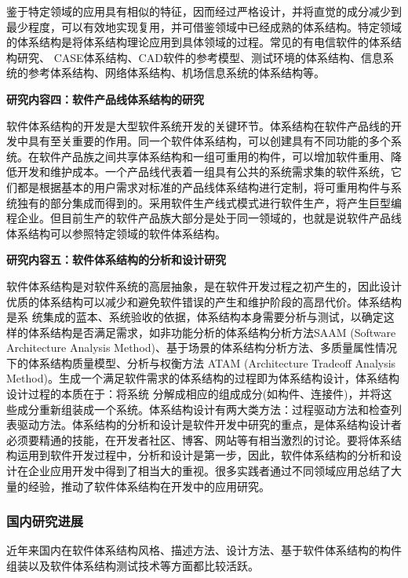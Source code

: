\documentclass[article]{BJTU-thesis}
\begin{document}
	鉴于特定领域的应用具有相似的特征，因而经过严格设计，并将直觉的成分减少到最少程度，可以有效地实现复用，并可借鉴领域中已经成熟的体系结构。特定领域的体系结构是将体系结构理论应用到具体领域的过程。常见的有电信软件的体系结构研究、 CASE体系结构、CAD软件的参考模型、测试环境的体系结构、信息系统的参考体系结构、网络体系结构、机场信息系统的体系结构等。
	\newline
	
	\noindent\textbf{研究内容四：软件产品线体系结构的研究}
	
	 软件体系结构的开发是大型软件系统开发的关键环节。体系结构在软件产品线的开发中具有至关重要的作用。同一个软件体系结构，可以创建具有不同功能的多个系统。在软件产品族之间共享体系结构和一组可重用的构件，可以增加软件重用、降低开发和维护成本。一个产品线代表着一组具有公共的系统需求集的软件系统，它们都是根据基本的用户需求对标准的产品线体系结构进行定制，将可重用构件与系统独有的部分集成而得到的。采用软件生产线式模式进行软件生产，将产生巨型编程企业。但目前生产的软件产品族大部分是处于同一领域的，也就是说软件产品线体系结构可以参照特定领域的软件体系结构。
	\newline
	
	\noindent\textbf{研究内容五：软件体系结构的分析和设计研究}
	
	软件体系结构是对软件系统的高层抽象，是在软件开发过程之初产生的，因此设计优质的体系结构可以减少和避免软件错误的产生和维护阶段的高昂代价。体系结构是系 统集成的蓝本、系统验收的依据，体系结构本身需要分析与测试，以确定这样的体系结构是否满足需求，如非功能分析的体系结构分析方法SAAM (Software Architecture Analysis Method)、基于场景的体系结构分析方法、多质量属性情况下的体系结构质量模型、分析与权衡方法 ATAM (Architecture Tradeoff Analysis Method)。生成一个满足软件需求的体系结构的过程即为体系结构设计，体系结构设计过程的本质在于：将系统 分解成相应的组成成分(如构件、连接件)，并将这些成分重新组装成一个系统。体系结构设计有两大类方法：过程驱动方法和检查列表驱动方法。体系结构的分析和设计是软件开发中研究的重点，是体系结构设计者必须要精通的技能，在开发者社区、博客、网站等有相当激烈的讨论。要将体系结构运用到软件开发过程中，分析和设计是第一步，因此，软件体系结构的分析和设计在企业应用开发中得到了相当大的重视。很多实践者通过不同领域应用总结了大量的经验，推动了软件体系结构在开发中的应用研究。
	
	\subsubsection{国内研究进展}
	近年来国内在软件体系结构风格、描述方法、设计方法、基于软件体系结构的构件组装以及软件体系结构测试技术等方面都比较活跃。
	\newline
	
\end{document}
